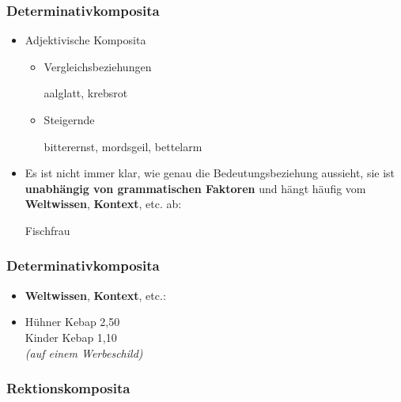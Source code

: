 \begin{frame}
\frametitle{Determinativkomposita}

\begin{itemize}
	\item Adjektivische Komposita
	
	\begin{itemize}
		\item Vergleichsbeziehungen
		
		\ea aalglatt, krebsrot
		\z
		
		\item Steigernde
		
		\ea bitterernst, mordsgeil, bettelarm
		\z
		
	\end{itemize}
	
	\item Es ist nicht immer klar, wie genau die Bedeutungsbeziehung aussieht, sie ist \textbf{unabhängig von grammatischen Faktoren} und hängt häufig vom \textbf{Weltwissen}, \textbf{Kontext}, etc. ab:
	
	\ea Fischfrau
	\z
	
\end{itemize}


\end{frame}


\begin{frame}
\frametitle{Determinativkomposita}

\begin{itemize}
	\item \textbf{Weltwissen}, \textbf{Kontext}, etc.:
	\item [] Hühner Kebap 2,50\\
	Kinder Kebap 1,10\\
	\emph{(auf einem Werbeschild)}
\end{itemize}


\end{frame}


\subsubsection{Rektionskomposita}


